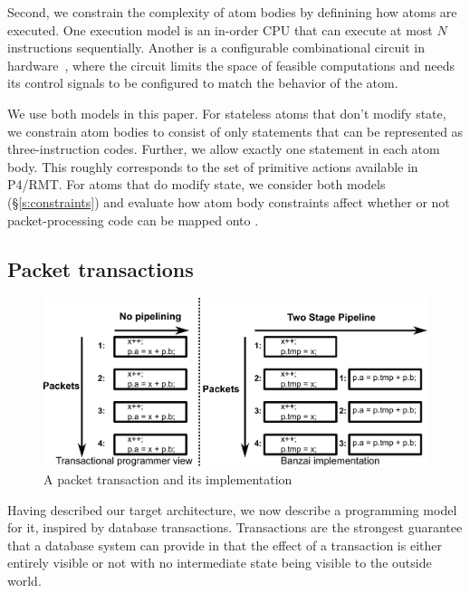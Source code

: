 Second, we constrain the complexity of atom bodies by definining how atoms are
executed. One execution model is an in-order CPU that can execute at most $N$
instructions sequentially. Another is a configurable combinational circuit in
hardware~\cite{dataflow}, where the circuit limits the space of feasible
computations and needs its control signals to be configured to match the
behavior of the atom.

We use both models in this paper. For stateless atoms that don't modify state,
we constrain atom bodies to consist of only statements that can be represented
as three-instruction codes. Further, we allow exactly one statement in each
atom body. This roughly corresponds to the set of primitive actions available
in P4/RMT.  For atoms that do modify state, we consider both models
(\S\ref{s:constraints}) and evaluate how atom body constraints affect whether
or not packet-processing code can be mapped onto \absmachine.

\subsection{Packet transactions}
\begin{figure}
  \includegraphics[width=\columnwidth]{spec_vs_impl.pdf}
  \caption{A packet transaction and its implementation}
  \label{fig:trans}
\end{figure}

Having described our target architecture, we now describe a programming model
for it, inspired by database transactions. Transactions are the strongest
guarantee that a database system can provide in that the effect of a
transaction is either entirely visible or not with no intermediate state being
visible to the outside world.

